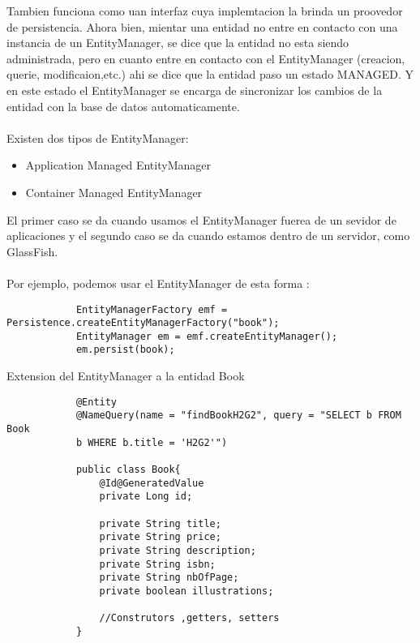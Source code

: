 \documentclass{article}
\begin{document}
Tambien funciona como uan interfaz cuya implemtacion la brinda un proovedor de persistencia. Ahora bien, mientar una entidad no entre en contacto con una instancia  de un EntityManager,
se dice que la entidad no esta siendo administrada, pero en cuanto entre en contacto con el EntityManager (creacion, querie, modificaion,etc.) ahi se dice que la entidad paso un estado
MANAGED. Y en este estado el EntityManager se encarga de sincronizar los cambios de la entidad con la base de datos automaticamente.\\ \\

Existen dos tipos de EntityManager:
\begin{itemize}
	\item Application Managed EntityManager
	\item Container Managed EntityManager
\end{itemize}

El primer caso se da cuando usamos el EntityManager fuerea de un sevidor de aplicaciones y el segundo caso se da cuando estamos dentro de un servidor, como GlassFish. \\ \\

Por ejemplo, podemos usar el EntityManager de esta forma :
\begin{lstlisting}
            EntityManagerFactory emf = Persistence.createEntityManagerFactory("book");
            EntityManager em = emf.createEntityManager();
            em.persist(book);
        \end{lstlisting}
Extension del EntityManager a la entidad Book
\begin{lstlisting}
            @Entity
            @NameQuery(name = "findBookH2G2", query = "SELECT b FROM Book 
            b WHERE b.title = 'H2G2'")

            public class Book{
                @Id@GeneratedValue
                private Long id; 

                private String title;
                private String price; 
                private String description;
                private String isbn;
                private String nbOfPage;
                private boolean illustrations;

                //Construtors ,getters, setters
            }
        \end{lstlisting}
\end{document}
